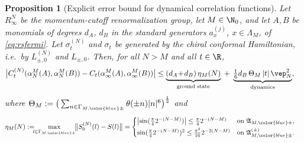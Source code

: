 \documentclass[a4paper, 11pt]{article}
\newcommand{\fA}{\mathfrak{A}}\newcommand{\cA}{\mathcal{A}}\newcommand{\dA}{\mathds{A}}\newcommand{\sA}{\mathscr{A}}
\DeclareMathOperator{\1}{\mathds{1}}
\newtheorem{prop}[thm]{Proposition}
\begin{document}
\begin{prop}[Explicit error bound for dynamical correlation functions]
\label{prop:corapproxrate}
Let $R^{N}_{\infty}$ be the momentum-cutoff renormalization group, let $M\in\N_{0}$, and let $A,B$ be monomials of degrees $d_{A}$, $d_{B}$ in the standard generators $a^{(j)}_{x}$, $x\in\Lambda_{M}$, of \eqref{eq:rsfermi}. Let $\sigma^{(N)}_{t}$ and $\sigma_{t}$ be generated by the chiral conformal Hamiltonian, i.e.~by $L^{(N)}_{\pm,0}$ and $L_{\pm,0}$. Then, for all $N>M$ and all $t\in\R$,
\begin{align}
\label{eq:corapproxrate}
\big|C^{(N)}_{t}(\alpha^{M}_{N}(A),\alpha^{M}_{N}(B))-C_{t}(\alpha^{M}_{\infty}(A),\alpha^{M}_{\infty}(B))\big| & \leq \underbrace{(d_{A}\!+\!d_{B})\!\ \eta_{M}(N)}_{\textup{ground state}} \; + \; \underbrace{\tfrac{1}{6}d_{B}\!\ \Theta_{M}\!\ |t|\!\ \vep_{N}^{2}}_{\textup{dynamics}},
\end{align}
where $\Theta_{M}:=\big(\sum_{n\in\Gamma_{M,{\color{blue}\pm}}}\theta(\pm n)|n|^{6}\big)^{\frac{1}{2}}$ and
\begin{align}
\label{eq:vacerrororders}
\eta_{M}(N) & := \!\!\!\max_{l\in\Gamma_{M,{\color{blue}\pm}}}\!\!\big\|S^{(N)}_{0}(l)-S(l)\big\| = \begin{cases} \big|\!\sin(\tfrac{\pi}{4}2^{-(N-M)})\big| \leq \tfrac{\pi}{4}2^{-(N-M)} & \textup{on }\fA_{M,{\color{blue}\pm}}, \\[0.1cm] \sin(\tfrac{\pi}{4}2^{-(N-M)})^{2} \leq \tfrac{\pi^{2}}{16}2^{-2(N-M)} & \textup{on }\fA^{(\pm)}_{M,{\color{blue}\pm}}. \end{cases}
\end{align}
\end{prop}
\end{document}
